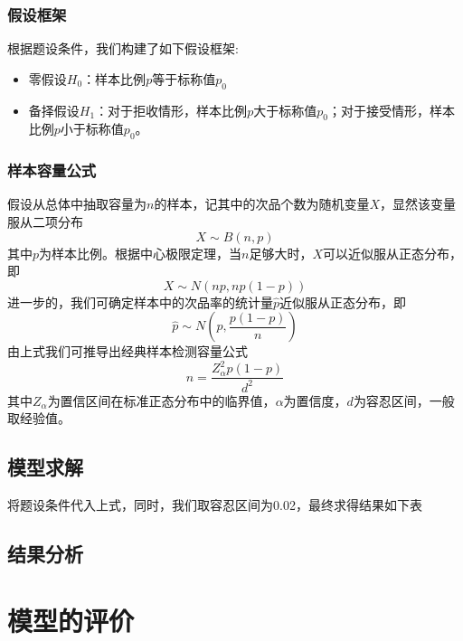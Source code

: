 \documentclass[withoutpreface,bwprint]{cumcmthesis}
\begin{document}
\subsubsection{假设框架}
根据题设条件，我们构建了如下假设框架:
\begin{itemize}
   \item 零假设$H_0$：样本比例$p$等于标称值$p_0$
   \item 备择假设$H_1$：对于拒收情形，样本比例$p$大于标称值$p_0$；对于接受情形，样本比例$p$小于标称值$p_0$。
\end{itemize}
\subsubsection{样本容量公式}
假设从总体中抽取容量为$n$的样本，记其中的次品个数为随机变量$X$，显然该变量服从二项分布
\begin{equation}
X\sim B(n,p)
\end{equation}
其中$p$为样本比例。根据中心极限定理，当$n$足够大时，$X$可以近似服从正态分布，即\begin{equation}
X\sim N(np,np(1-p))
\end{equation}
进一步的，我们可确定样本中的次品率的统计量$\hat{p}$近似服从正态分布，即
\begin{equation}
\hat{p}\sim N(p,\frac{p(1-p)}{n})
\end{equation}
由上式我们可推导出经典样本检测容量公式
\begin{equation}
n=\frac{Z^2_{\alpha}p(1-p)}{d^2}
\end{equation}
其中$Z_{\alpha}$为置信区间在标准正态分布中的临界值，$\alpha$为置信度，$d$为容忍区间，一般取经验值。

\subsection{模型求解}
将题设条件代入上式，同时，我们取容忍区间为0.02，最终求得结果如下表
\subsection{结果分析}










\section{模型的评价}
\end{document}
